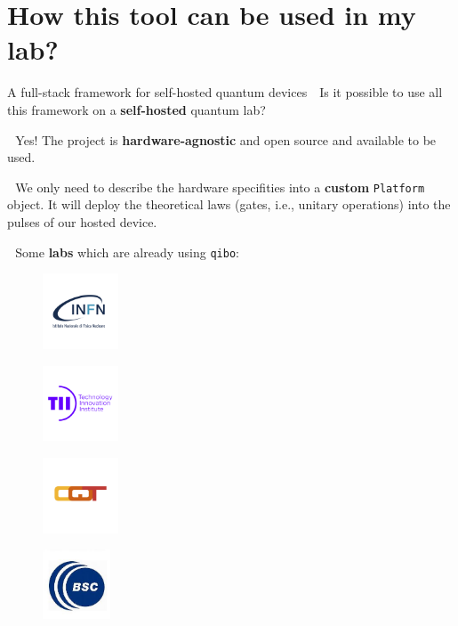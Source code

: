 \documentclass[8pt, xcolor={svgnames}, hyperref={colorlinks,linkcolor=black, citecolor=amethyst, urlcolor=amethyst}]{beamer}
\begin{document}
\section{How this tool can be used in my lab?}


\begin{frame}{A full-stack framework for self-hosted quantum devices}
\large 
\faArrowCircleRight\,\, Is it possible to use all this framework on a \textbf{self-hosted} quantum lab?

\pause

\faArrowCircleRight\,\, Yes! The project is \textbf{hardware-agnostic} and open source and available to be used. 

\pause

\faArrowCircleRight\,\, We only need to describe the hardware specifities into a 
\textbf{custom} \texttt{Platform} object.  It will deploy the theoretical laws 
(gates, i.e., unitary operations) into the pulses of our hosted device.

\pause

\faArrowCircleRight\,\, Some \textbf{labs} which are already using \texttt{qibo}:

\begin{multicols}{4}
\begin{figure}
    \centering 
    \includegraphics[width=0.2\textwidth]{figures/infn.png}
\end{figure}
\begin{figure}
    \centering 
    \includegraphics[width=0.2\textwidth]{figures/tii.png}
\end{figure}
\begin{figure}
    \centering 
    \includegraphics[width=0.2\textwidth]{figures/cqt.png}
\end{figure}
\begin{figure}
    \centering 
    \includegraphics[width=0.18\textwidth]{figures/bsc.jpg}
\end{figure}
\end{multicols}


\end{frame}
\end{document}
